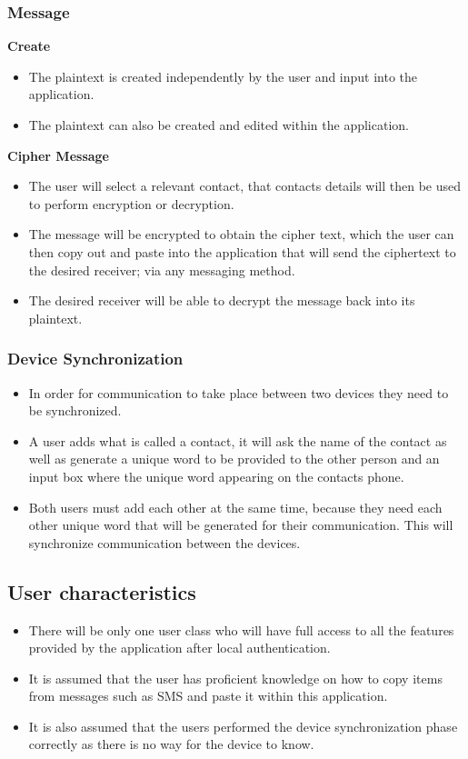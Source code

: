 \subsubsection{Message}
\textbf{Create}
\begin{itemize}
\item The plaintext is created independently by the user and input into the application.
\item The plaintext can also be created and edited within the application.
\end{itemize}
\textbf{Cipher Message}
\begin{itemize}
\item The user will select a relevant contact, that contacts details will then be used to perform encryption or decryption.
\item The message will be encrypted to obtain the cipher text, which the user can then copy out and paste into the application that will send the ciphertext to the desired receiver; via any messaging method.
\item The desired receiver will be able to decrypt the message back into its plaintext.
\end{itemize}

\subsubsection{Device Synchronization}
\begin{itemize}
\item In order for communication to take place between two devices they need to be synchronized.
\item A user adds what is called a contact, it will ask the name of the contact as well as generate a unique word to be provided to the other person and an input box where the unique word appearing on the contacts phone.
\item Both users must add each other at the same time, because they need each other unique word that will be generated for their communication. This will synchronize communication between the devices.
\end{itemize}

\subsection{User characteristics}
\begin{itemize}
\item There will be only one user class who will have full access to all the features provided by the application after local authentication.
\item It is assumed that the user has proficient knowledge on how to copy items from messages such as SMS and paste it within this application.
\item It is also assumed that the users performed the device synchronization phase correctly as there is no way for the device to know.
\end{itemize}


